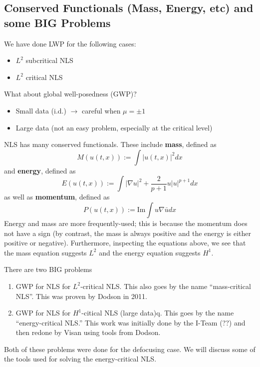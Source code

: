\documentclass{article}
\begin{document}
\subsection{Conserved Functionals (Mass, Energy, etc) and some BIG Problems}
We have done LWP for the following cases:
\begin{itemize}
  \item $L^{2}$ subcritical NLS
  \item $L^{2}$ critical NLS 
\end{itemize}
What about global well-posedness (GWP)?
\begin{itemize}
  \item Small data (i.d.) $\to $ careful when $\mu=\pm 1$
  \item Large data (not an easy problem, especially at the critical level)
\end{itemize}
NLS has many conserved functionals. These include \textbf{mass}, defined as
\begin{equation*}
  M(u(t,x)) := \int \left| u(t,x) \right|^{2}dx
\end{equation*}
and \textbf{energy}, defined as
\begin{equation*}
  E(u(t,x)) := \int \left| \nabla u \right|^{2} + \frac{2}{p+1}u|u|^{p+1}dx
\end{equation*}
as well as \textbf{momentum}, defined as
\begin{equation*}
  P(u(t,x)) := \mathrm{Im} \int u \nabla \bar{u} dx 
\end{equation*}
Energy and mass are more frequently-used; this is because the momentum does not
have a sign (by contrast, the mass is always positive and the energy is either
positive or negative). Furthermore, inspecting the equations above, we see that
the mass equation suggests $L^2$ and the energy equation suggests $H^{1}$.

There are two BIG problems
\begin{enumerate}
  \item GWP for NLS for $L^2$-critical NLS. This also goes by the name
  ``mass-critical NLS''. This was proven by Dodson in 2011.
  \item GWP for NLS for $H^{1}$-citical NLS (large data)q. This goes by the name
  ``energy-critical NLS.'' This work was initially done by the I-Team (??) and
  then redone by Visan using tools from Dodson.
\end{enumerate}
Both of these problems were done for the defocusing case. We will discuss some
of the tools used for solving the energy-critical NLS.
\end{document}
